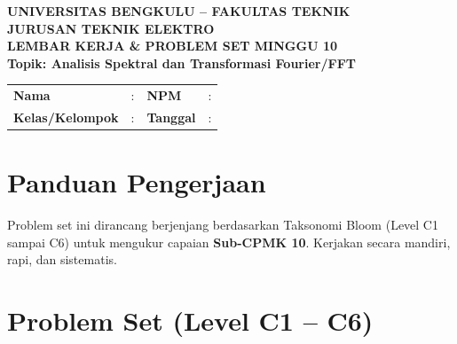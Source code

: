 \documentclass[11pt,a4paper]{article}
\begin{document}
\begin{center}
    {\large \textbf{\color{primaryblue}UNIVERSITAS BENGKULU -- FAKULTAS TEKNIK}}\\[0.1cm]
    {\large \textbf{\color{secondaryblue}JURUSAN TEKNIK ELEKTRO}}\\[0.25cm]
    {\LARGE \textbf{\color{primaryblue}LEMBAR KERJA \& PROBLEM SET MINGGU 10}}\\[0.1cm]
    {\normalsize \textbf{Topik: Analisis Spektral dan Transformasi Fourier/FFT}}
\end{center}

\vspace{0.2cm}

\begin{tcolorbox}[colback=boxbg,colframe=primaryblue,arc=2mm,title=\textbf{Identitas Mahasiswa}]
\small
\begin{tabular}{p{2.5cm}p{5.5cm}p{2.5cm}p{4.5cm}}
\textbf{Nama} & : \dotfill & \textbf{NPM} & : \dotfill \\
\textbf{Kelas/Kelompok} & : \dotfill & \textbf{Tanggal} & : \dotfill \\
\end{tabular}
\end{tcolorbox}

\vspace{0.2cm}

\section{Panduan Pengerjaan}
Problem set ini dirancang berjenjang berdasarkan Taksonomi Bloom (Level C1 sampai C6) untuk mengukur capaian \textbf{Sub-CPMK 10}. Kerjakan secara mandiri, rapi, dan sistematis.

\section{Problem Set (Level C1 -- C6)}
\end{document}
